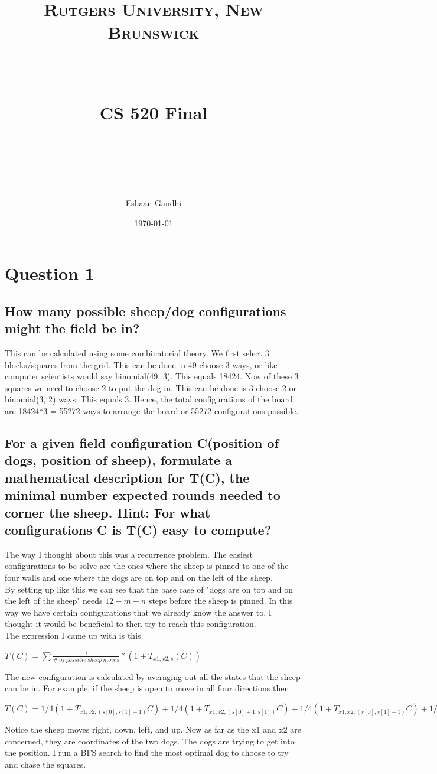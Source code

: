 \documentclass[11pt]{scrartcl} %
\title{	
	\normalfont\normalsize
	\textsc{Rutgers University, New Brunswick}\\ %
	\vspace{25pt} %
	\rule{\linewidth}{0.5pt}\\ %
	\vspace{20pt} %
	{\huge CS 520 Final}\\ %
	\vspace{12pt} %
	\rule{\linewidth}{2pt}\\ %
	\vspace{12pt} %
}
\author{\LARGE Eshaan Gandhi} %
\date{\normalsize\today} %
\begin{document}
\maketitle %
\section{Question 1}
\subsection{How many possible sheep/dog configurations might the field be in?}
This can be calculated using some combinatorial theory. We first select 3 blocks/squares from the grid. This can be done in 49 choose 3 ways, or like computer scientists would say binomial(49, 3). This equals 18424. Now of these 3 squares we need to choose 2 to put the dog in. This can be done is 3 choose 2 or binomial(3, 2) ways. This equals 3. Hence, the total configurations of the board are 18424*3 = 55272 ways to arrange the board or 55272 configurations possible. 
\subsection{For a given field configuration C(position of dogs, position of sheep), formulate a mathematical description for T(C), the minimal number expected rounds needed to corner the sheep. Hint:  For what configurations C is T(C) easy to compute?} 
The way I thought about this was a recurrence problem. The easiest configurations to be solve are the ones where the sheep is pinned to one of the four walls and one where the dogs are on top and on the left of the sheep.\\
By setting up like this we can see that the base case of "dogs are on top and on the left of the sheep" needs $12-m-n$ steps before the sheep is pinned. In this way we have certain configurations that we already know the answer to. I thought it would be beneficial to then try to reach this configuration. \\
The expression I came up with is this
\begin{center}
$T(C) = \sum \frac{1}{\#\ of\ possible\ sheep\ moves}*(1+T_{x1, x2, s}(C))$
\end{center} 
The new configuration is calculated by averaging out all the states that the sheep can be in. For example, if the sheep is open to move in all four directions then
\begin{center}
$T(C) = 1/4(1+T_{x1, x2, (s[0], s[1]+1)}C)+1/4(1+T_{x1, x2, (s[0]+1, s[1])}C)+1/4(1+T_{x1, x2, (s[0], s[1]-1)}C)+1/4(1+T_{x1, x2, (s[0]-1, s[1])}C)$
\end{center}
Notice the sheep moves right, down, left, and up. Now as far as the x1 and x2 are concerned, they are coordinates of the two dogs. The dogs are trying to get into the position. I run a BFS search to find the most optimal dog to choose to try and chase the squares. 
\end{document}
